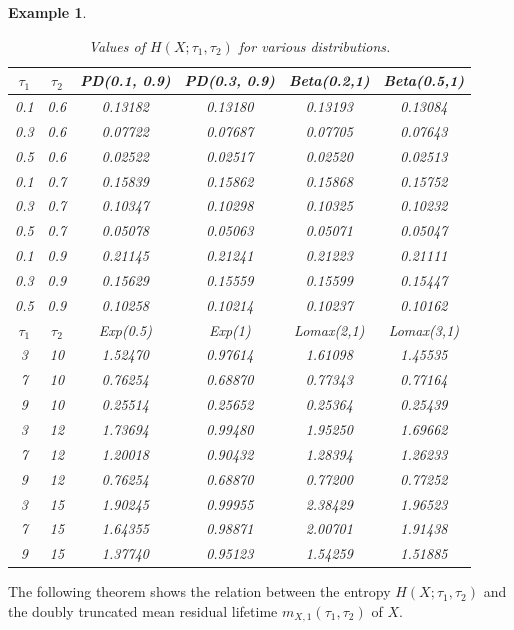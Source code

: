 \documentclass[11pt]{article}
\newtheorem{example}{Example}
\begin{document}
\begin{example}
\begin{table}[H]
\centering
\caption{Values of $H(X; \tau_1, \tau_2)$ for various distributions.}\label{tab:H}
\begin{tabular}{@{}cccccc@{}}
\toprule
$\tau_1$ & $\tau_2$ & PD(0.1, 0.9) & PD(0.3, 0.9) & Beta(0.2,1) & Beta(0.5,1) \\
\midrule
0.1 & 0.6 & 0.13182 & 0.13180 & 0.13193 & 0.13084  \\ 
0.3 & 0.6 & 0.07722 & 0.07687 & 0.07705 & 0.07643  \\ 
0.5 & 0.6 & 0.02522 & 0.02517 & 0.02520 & 0.02513  \\ 
0.1 & 0.7 & 0.15839 & 0.15862 & 0.15868 & 0.15752  \\ 
0.3 & 0.7 & 0.10347 & 0.10298 & 0.10325 & 0.10232  \\ 
0.5 & 0.7 & 0.05078 & 0.05063 & 0.05071 & 0.05047  \\ 
0.1 & 0.9 & 0.21145 & 0.21241 & 0.21223 & 0.21111  \\ 
0.3 & 0.9 & 0.15629 & 0.15559 & 0.15599 & 0.15447  \\ 
0.5 & 0.9 & 0.10258 & 0.10214 & 0.10237 & 0.10162  \\ 
\midrule
$\tau_1$ & $\tau_2$ & Exp(0.5) & Exp(1) & Lomax(2,1) & Lomax(3,1)\\ 
\midrule
3 & 10 & 1.52470 & 0.97614 & 1.61098 & 1.45535 \\ 
7 & 10 & 0.76254 & 0.68870 & 0.77343 & 0.77164 \\ 
9 & 10 & 0.25514 & 0.25652 & 0.25364 & 0.25439 \\ 
3 & 12 & 1.73694 & 0.99480 & 1.95250 & 1.69662 \\ 
7 & 12 & 1.20018 & 0.90432 & 1.28394 & 1.26233 \\ 
9 & 12 & 0.76254 & 0.68870 & 0.77200 & 0.77252 \\ 
3 & 15 & 1.90245 & 0.99955 & 2.38429 & 1.96523 \\ 
7 & 15 & 1.64355 & 0.98871 & 2.00701 & 1.91438 \\ 
9 & 15 & 1.37740 & 0.95123 & 1.54259 & 1.51885 \\ 
\bottomrule
\end{tabular}
\end{table}

\end{example}

The following theorem shows the relation between the entropy $H(X;\tau_1,\tau_2)$ and the doubly truncated mean residual lifetime $m_{X,1}(\tau_1,\tau_2)$ of $X$.    
\end{document}
